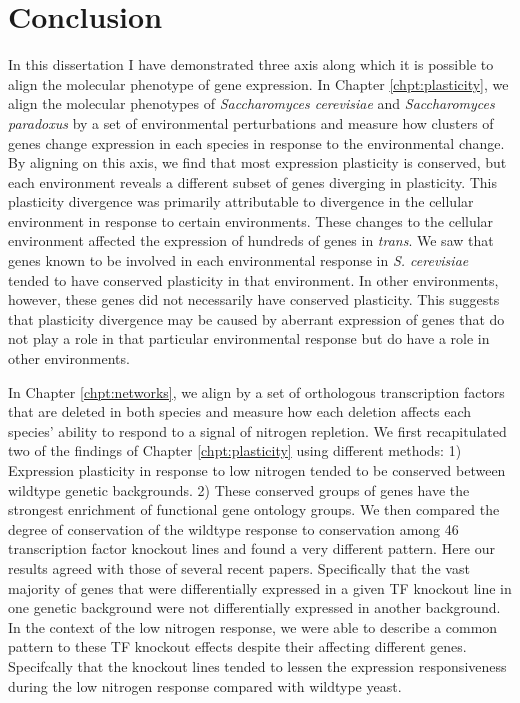 \chapter*{Conclusion}

In this dissertation I have demonstrated three axis along which it is possible to align the molecular phenotype of gene expression. In Chapter \ref{chpt:plasticity}, we align the molecular phenotypes of \textit{Saccharomyces cerevisiae} and \textit{Saccharomyces paradoxus} by a set of environmental perturbations and measure how clusters of genes change expression in each species in response to the environmental change. By aligning on this axis, we find that  most expression plasticity is conserved, but each environment reveals a different subset of genes diverging in plasticity. This plasticity divergence was primarily attributable to divergence in the cellular environment in response to certain environments. These changes to the cellular environment affected the expression of hundreds of genes in \textit{trans}. We saw that genes known to be involved in each environmental response in \textit{S. cerevisiae} tended to have conserved plasticity in that environment. In other environments, however, these genes did not necessarily have conserved plasticity. This suggests that plasticity divergence may be caused by aberrant expression of genes that do not play a role in that particular environmental response but do have a role in other environments.

In Chapter \ref{chpt:networks}, we align by a set of orthologous transcription factors that are deleted in both species and measure how each deletion affects each species' ability to respond to a signal of nitrogen repletion. We first recapitulated two of the findings of Chapter \ref{chpt:plasticity} using different methods: 1) Expression plasticity in response to low nitrogen tended to be conserved between wildtype genetic backgrounds. 2) These conserved groups of genes have the strongest enrichment of functional gene ontology groups. We then compared the degree of conservation of the wildtype response to conservation among 46 transcription factor knockout lines and found a very different pattern. Here our results agreed with those of several recent papers. Specifically that the vast majority of genes that were differentially expressed in a given TF knockout line in one genetic background were not differentially expressed in another background. In the context of the low nitrogen response, we were able to describe a common pattern to these TF knockout effects despite their affecting different genes. Specifcally that the knockout lines tended to lessen the expression responsiveness during the low nitrogen response compared with wildtype yeast.

